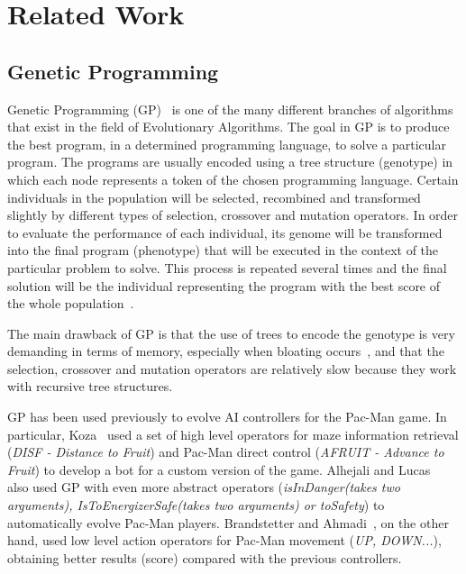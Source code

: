 \documentclass{llncs}
\begin{document}


%
\section{Related Work}
\label{sec:relatedWork}
%

\subsection{Genetic Programming}

Genetic Programming (GP)~\cite{poli_langdon_mcphee_koza_2008} is one of the many different branches of algorithms that exist in the field of Evolutionary Algorithms. The goal in GP is to produce the best program, in a determined programming language, to solve a particular program. The programs are usually encoded using a tree structure (genotype) in which each node represents a token of the chosen programming language. Certain individuals in the population will be selected, recombined and transformed slightly by different types of selection, crossover and mutation operators.
In order to evaluate the performance of each individual, its genome will be transformed into the final program (phenotype) that will be executed in the context of the particular problem to solve. This process is repeated several times and the final solution will be the individual representing the program with the best score of the whole population~\cite{cervigon}. 

The main drawback of GP is that the use of trees to encode the genotype is very demanding in terms of memory, especially when bloating occurs~\cite{Poli2003}, and that the selection, crossover and mutation operators are relatively slow because they work with recursive tree structures.

GP has been used previously to evolve AI controllers for the Pac-Man game. In particular, Koza~ \cite{koza1992genetic} used a set of high level operators for maze information retrieval (\textit{DISF - Distance to Fruit}) and Pac-Man direct control (\textit{AFRUIT - Advance to Fruit}) to develop a bot for a custom version of the game. Alhejali and Lucas~\cite{alhejali_lucas_2010} also used GP with even more abstract operators (\textit{isInDanger(takes two arguments), IsToEnergizerSafe(takes two arguments) or toSafety}) to automatically evolve Pac-Man players. Brandstetter and Ahmadi~\cite{brandstetter_ahmadi_2012}, on the other hand, used low level action operators for Pac-Man movement (\textit{UP, DOWN...}), obtaining better results (score) compared with the previous controllers.
\end{document}

